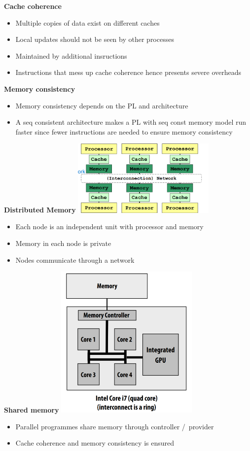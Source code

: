 \documentclass[10pt, landscape]{article}
\begin{document}
\begin{multicols}{4}
\textbf{Cache coherence}
\begin{itemize}
    \item Multiple copies of data exist on different caches 
    \item Local updates should not be seen by other processes 
    \item Maintained by additional insructions 
    \item Instructions that mess up cache coherence hence presents severe overheads
\end{itemize}

\textbf{Memory consistency}
\begin{itemize}
    \item Memory consistency depends on the PL and architecture 
    \item A seq consistent architecture makes a PL with seq const memory model run faster since fewer instructions are needed to ensure memory consistency
\end{itemize}


\textbf{Distributed Memory }
\includegraphics*[width=7cm]{distributed_memory}
\begin{itemize}
    \item Each node is an independent unit with processor and memory 
    \item Memory in each node is private 
    \item Nodes communicate through a network 
\end{itemize}

\textbf{Shared memory}
\includegraphics*[width=7cm]{i7_shared}
\begin{itemize}
    \item Parallel programmes share memory through controller /\ provider
    \item Cache coherence and memory consistency is ensured 
\end{itemize}



\end{multicols}
\end{document}
